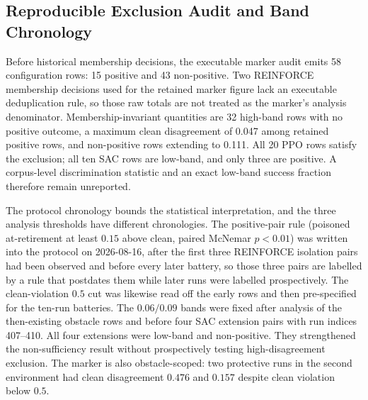\subsection{Reproducible Exclusion Audit and Band Chronology}

Before historical membership decisions, the executable marker audit emits 58
configuration rows: 15 positive and 43 non-positive.  Two REINFORCE membership
decisions used for the retained marker figure lack an executable deduplication
rule, so those raw totals are not treated as the marker's analysis denominator.
Membership-invariant quantities are 32 high-band rows with no positive outcome,
a maximum clean disagreement of 0.047 among retained positive rows, and
non-positive rows extending to 0.111.  All 20 PPO rows satisfy the exclusion;
all ten SAC rows are low-band, and only three are positive.  A corpus-level
discrimination statistic and an exact low-band success fraction therefore
remain unreported.

The protocol chronology bounds the statistical interpretation, and the three
analysis thresholds have different chronologies.  The positive-pair rule
(poisoned at-retirement at least $0.15$ above clean, paired McNemar $p<0.01$)
was written into the protocol on 2026-08-16, after the first three REINFORCE
isolation pairs had been observed and before every later battery, so those
three pairs are labelled by a rule that postdates them while later runs were
labelled prospectively.  The clean-violation $0.5$ cut was likewise
read off the early rows and then pre-specified for the ten-run batteries.  The
$0.06/0.09$ bands were fixed after analysis of the then-existing obstacle rows
and before four SAC extension pairs with run indices 407--410.  All four
extensions were low-band and non-positive.  They strengthened the
non-sufficiency result without prospectively testing high-disagreement
exclusion.  The marker is also obstacle-scoped: two protective runs in the
second environment had clean disagreement $0.476$ and $0.157$ despite clean
violation below $0.5$.
